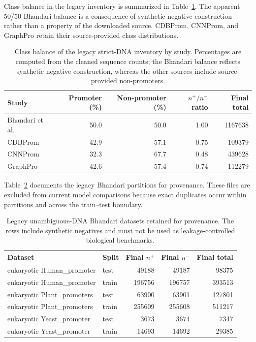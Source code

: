 Class balance in the legacy inventory is summarized in
Table~\ref{tab:within-source-class-balance}. The apparent 50/50 Bhandari balance
is a consequence of synthetic negative construction rather than a property of
the downloaded source. CDBProm, CNNProm, and GraphPro retain their
source-provided class distributions.

\begin{table}[htbp]
\centering
\caption{Class balance of the legacy strict-DNA inventory by study. Percentages are computed from the cleaned sequence counts; the Bhandari balance reflects synthetic negative construction, whereas the other sources include source-provided non-promoters.}
\label{tab:within-source-class-balance}
\begin{tabular}{lrrrr}
\hline
Study & Promoter (\%) & Non-promoter (\%) & $n^{+}/n^{-}$ ratio & Final total \\
\hline
Bhandari et al. & 50.0 & 50.0 & 1.00 & 1167638 \\
CDBProm & 42.9 & 57.1 & 0.75 & 109379 \\
CNNProm & 32.3 & 67.7 & 0.48 & 439628 \\
GraphPro & 42.6 & 57.4 & 0.74 & 112279 \\
\hline
\end{tabular}
\end{table}

Table~\ref{tab:bhandari-within-source-final} documents the legacy Bhandari
partitions for provenance. These files are excluded from current model
comparisons because exact duplicates occur within partitions and across the
train--test boundary.

\begin{table}[htbp]
\centering
\small
\caption{Legacy unambiguous-DNA Bhandari datasets retained for provenance. The rows include synthetic negatives and must not be used as leakage-controlled biological benchmarks.}
\label{tab:bhandari-within-source-final}
\begin{tabular}{p{}lrrr}
\hline
Dataset & Split & Final $n^{+}$ & Final $n^{-}$ & Final total \\
\hline
eukaryotic Human\_promoter & test & 49188 & 49187 & 98375 \\
eukaryotic Human\_promoter & train & 196756 & 196757 & 393513 \\
eukaryotic Plant\_promoters & test & 63900 & 63901 & 127801 \\
eukaryotic Plant\_promoters & train & 255609 & 255608 & 511217 \\
eukaryotic Yeast\_promoter & test & 3673 & 3674 & 7347 \\
eukaryotic Yeast\_promoter & train & 14693 & 14692 & 29385 \\
\hline
\end{tabular}
\end{table}


